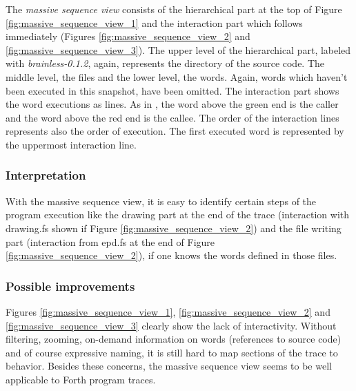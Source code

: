 The \emph{massive sequence view} consists of the hierarchical part at the top of Figure \ref{fig:massive_sequence_view_1} and the interaction part which follows immediately (Figures \ref{fig:massive_sequence_view_2} and \ref{fig:massive_sequence_view_3}). The upper level of the hierarchical part, labeled with \emph{brainless-0.1.2}, again, represents the directory of the source code. The middle level, the files and the lower level, the words. Again, words which haven't been executed in this snapshot, have been omitted.
The interaction part shows the word executions as lines. As in \cite{Holten:2006:HEB:1187627.1187772}, the word above the green end is the caller and the word above the red end is the callee. The order of the interaction lines represents also the order of execution. The first executed word is represented by the uppermost interaction line.

\subsubsection*{Interpretation}

With the massive sequence view, it is easy to identify certain steps of the program execution like the drawing part at the end of the trace (interaction with drawing.fs shown if Figure \ref{fig:massive_sequence_view_2}) and the file writing part (interaction from epd.fs at the end of Figure \ref{fig:massive_sequence_view_2}), if one knows the words defined in those files.

\subsubsection*{Possible improvements}

Figures \ref{fig:massive_sequence_view_1}, \ref{fig:massive_sequence_view_2} and \ref{fig:massive_sequence_view_3} clearly show the lack of interactivity. Without filtering, zooming, on-demand information on words (references to source code) and of course expressive naming, it is still hard to map sections of the trace to behavior. Besides these concerns, the massive sequence view seems to be well applicable to Forth program traces.

